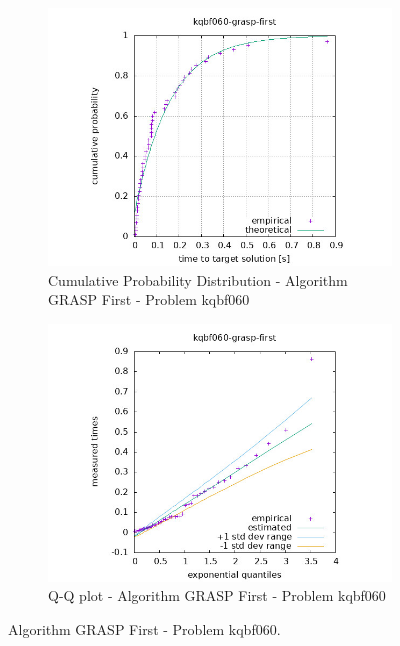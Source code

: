 \begin{figure}[H]
    \centering
    \begin{subfigure}{0.49\textwidth}
        \includegraphics[width=\textwidth]{figure/ttt_plot/kqbf060-grasp-first-exp.jpeg}
        \caption{Cumulative Probability Distribution - Algorithm GRASP First - Problem kqbf060}
        \label{fig:grasp-first-kqbf060-exp}
    \end{subfigure}
    \hfill
    \begin{subfigure}{0.49\textwidth}
        \includegraphics[width=\textwidth]{figure/ttt_plot/kqbf060-grasp-first-qq.jpeg}
        \caption{Q-Q plot - Algorithm GRASP First - Problem kqbf060}
        \label{fig:grasp-first-kqbf060-qq}
    \end{subfigure}
    \caption{Algorithm GRASP First - Problem kqbf060.}
    \label{fig:grasp-first-kqbf060}
\end{figure}


